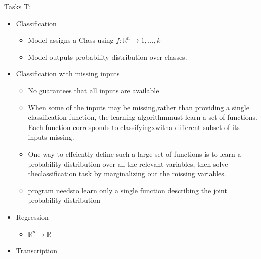 \documentclass[../Main.tex]{subfiles}
\begin{document}

Tasks T:
\begin{itemize}
    \item Classification 
        \begin{itemize}
            \item Model assigns a Class using \(f : \mathbb{R}^n \to {1,\dots,k}\)
            \item Model outputs probability distribution over classes. 
        \end{itemize}
    \item Classiﬁcation with missing inputs
        \begin{itemize}
            \item No guarantees that all inputs are available
            \item When some of the inputs may be missing,rather than providing a single classiﬁcation function,
            the learning algorithmmust learn a set of functions.
            Each function corresponds to classifyingxwitha diﬀerent subset of its inputs missing.
            \item One way to effciently deﬁne such a large set of functions is to learn a probability distribution
            over all the relevant variables, then solve theclassiﬁcation task by
            marginalizing out the missing variables.
            \item program needsto learn only a single function describing the joint probability distribution
        \end{itemize}
    \item Regression
        \begin{itemize}
            \item \(\mathbb{R}^n \to \mathbb{R}\)
        \end{itemize}
    \item Transcription
        \begin{itemize}

\end{itemize}
\end{itemize}
\end{document}
